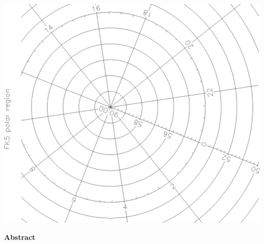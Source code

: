 \documentclass[twoside,11pt]{article}
\newenvironment{latexonly}{}{}
\begin{document}
\begin{latexonly}
\begin{center}
   \includegraphics[scale=0.25,angle=-90]{sun211_figures/frontc_bw.eps}\hfill
   \mbox{}
   \end{center}

   \begin{center}
      {\Large\bf Abstract}
   \end{center}
\end{latexonly}
\end{document}
